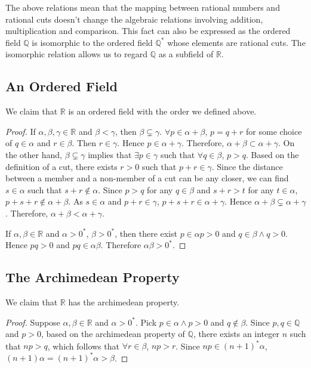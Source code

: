 \documentclass[onecolumn]{article}
\begin{document}
The above relations mean that the mapping between rational numbers and rational 
cuts doesn't change the algebraic relations involving addition, multiplication 
and comparison. This fact can also be expressed as the ordered field $\mathbb{Q}$ 
is isomorphic to the ordered field $\mathbb{Q^*}$ whose elements are rational 
cuts. The isomorphic relation allows us to regard $\mathbb{Q}$ as a subfield of 
$\mathbb{R}$.

\subsection{An Ordered Field}

We claim that $\mathbb{R}$ is an ordered field with the order we defined above.
\begin{proof}
If $\alpha, \beta, \gamma \in \mathbb{R}$ and $\beta < \gamma$, then 
$\beta \subsetneq \gamma$. $\forall p \in \alpha + \beta$, $p = q + r$ for some 
choice of $q \in \alpha$ and $r \in \beta$. Then $r \in \gamma$. Hence 
$p \in \alpha + \gamma$. Therefore, $\alpha + \beta \subset \alpha + \gamma$. On 
the other hand, $\beta \subsetneq \gamma$ implies that $\exists p \in \gamma$ 
such that $\forall q \in \beta$, $p > q$. Based on the definition of a cut, 
there exists $r > 0$ such that $p + r \in \gamma$. Since the distance between a 
member and a non-member of a cut can be any closer, we can find $s \in \alpha$ 
such that $s + r \notin \alpha$. Since $p > q$ for any $q \in \beta$ and 
$s + r > t$ for any $t \in \alpha$, $p + s + r \notin \alpha + \beta$. As 
$s \in \alpha$ and $p + r \in \gamma$, $p + s + r \in \alpha + \gamma$. Hence 
$\alpha + \beta \subsetneq \alpha + \gamma$. Therefore, 
$\alpha + \beta < \alpha + \gamma$.

If $\alpha, \beta \in \mathbb{R}$ and $\alpha > 0^*$, $\beta > 0^*$, then there 
exist $p \in \alpha p > 0$ and $q \in \beta \wedge q > 0$. Hence $pq > 0$ and 
$pq \in \alpha \beta$. Therefore $\alpha \beta > 0^*$. 
\end{proof}

\subsection{The Archimedean Property}

We claim that $\mathbb{R}$ has the archimedean property.
\begin{proof}
  Suppose $\alpha, \beta \in \mathbb{R}$ and $\alpha > 0^*$. Pick 
  $p \in \alpha \wedge p > 0$ and $q \notin \beta$. Since $p, q \in \mathbb{Q}$ 
  and $p > 0$, based on the archimedean property of $\mathbb{Q}$, there exists 
  an integer $n$ such that $np > q$, which follows that $\forall r \in \beta$, 
  $np > r$. Since $np \in (n+1)^* \alpha$, $(n+1)\alpha = (n+1)^*\alpha > \beta$.
\end{proof}
\end{document}
